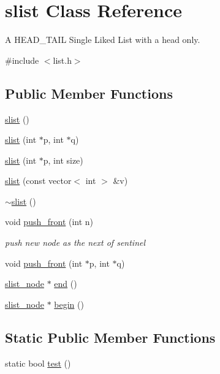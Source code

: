 \hypertarget{classslist}{\section{slist Class Reference}
\label{classslist}
}


A H\-E\-A\-D\-\_\-\-T\-A\-I\-L Single Liked List with a head only.  




{\ttfamily \#include $<$list.\-h$>$}

\subsection*{Public Member Functions}
\begin{DoxyCompactItemize}
\item 
\hyperlink{classslist_aa8463ea4036bf8719f3faea241934858}{slist} ()
\item 
\hyperlink{classslist_a6a1a6479ec39a88e235c3571310ef275}{slist} (int $\ast$p, int $\ast$q)
\item 
\hyperlink{classslist_a37ec931ec2c1db1814e6e8bcb9940c59}{slist} (int $\ast$p, int size)
\item 
\hyperlink{classslist_a617a9bf75e1c3941ad1836cb168ec82b}{slist} (const vector$<$ int $>$ \&v)
\item 
\hyperlink{classslist_a4796fe87f2eb252c1d1b2ba7709cbe48}{$\sim$slist} ()
\item 
void \hyperlink{classslist_a40b17ed0d9449c5598d81275be700bb8}{push\-\_\-front} (int n)
\begin{DoxyCompactList}\small\item\em push new node as the next of sentinel \end{DoxyCompactList}\item 
void \hyperlink{classslist_abb64b3b995a604b62ab40a198ce4087c}{push\-\_\-front} (int $\ast$p, int $\ast$q)
\item 
\hyperlink{structslist__node}{slist\-\_\-node} $\ast$ \hyperlink{classslist_ae191f100c7bc3def2666f7164fa879a1}{end} ()
\item 
\hyperlink{structslist__node}{slist\-\_\-node} $\ast$ \hyperlink{classslist_af06c620ab7044adfe88f616b8df766b2}{begin} ()
\end{DoxyCompactItemize}
\subsection*{Static Public Member Functions}
\begin{DoxyCompactItemize}
\item 
static bool \hyperlink{classslist_a8cf488d289941111597ca79f1b45bfac}{test} ()
\end{DoxyCompactItemize}


